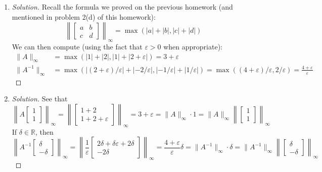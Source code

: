 \documentclass{article}
\newcommand{\R}{{\mathbb R}}
\newcommand{\ep}{{\varepsilon}}
\begin{document}
\begin{enumerate}
	\item \begin{proof}[Solution]\let\qed\relax
		Recall the formula we proved on the previous homework
		(and mentioned in problem 2(d) of this homework):
		\[
			\left\lVert \begin{bmatrix} a & b \\ c & d \end{bmatrix}\right\rVert_\infty
			= \max(|a| + |b|, |c| + |d|)
		\]
		We can then compute (using the fact that $\ep > 0$ when appropriate):
		\begin{align*}
			\lVert A \rVert_\infty
			&= \max(|1| + |2|,|1| + |2+\ep|)
			= 3 + \ep\\
			\lVert A^{-1} \rVert_\infty
			&= \max(|(2+\ep)/\ep| + |-2/\ep|,|-1/\ep| + |1/\ep|)
			= \max((4+\ep)/\ep,2/\ep)
			= \frac{4+\ep}{\ep}
		\end{align*}
	\end{proof}
	\item \begin{proof}[Solution]\let\qed\relax
		See that
		\[
			\left\lVert A\begin{bmatrix} 1 \\ 1 \end{bmatrix} \right\rVert_\infty
			= \left\lVert \begin{bmatrix} 1 + 2 \\ 1  + 2 + \ep \end{bmatrix}\right\rVert_\infty
			= 3 + \ep
			= \lVert A \rVert_\infty \cdot 1
			= \lVert A \rVert_\infty \left\lVert
			\begin{bmatrix} 1 \\ 1 \end{bmatrix} \right\rVert_\infty
		\]
		If $\delta \in \R$, then
		\[
			\left\lVert A^{-1}\begin{bmatrix} \delta \\ -\delta \end{bmatrix} \right\rVert_\infty
			= \left\lVert \frac{1}{\ep}
			\begin{bmatrix} 2\delta+\delta\ep + 2\delta \\ -2\delta \end{bmatrix} \right\rVert_\infty
			= \frac{4 + \ep}{\ep}\delta
			= \lVert A^{-1} \rVert_\infty\cdot\delta
			= \lVert A^{-1} \rVert_\infty \left\lVert
			\begin{bmatrix} \delta \\ -\delta \end{bmatrix} \right\rVert_\infty
\]
\end{proof}
\end{enumerate}
\end{document}
